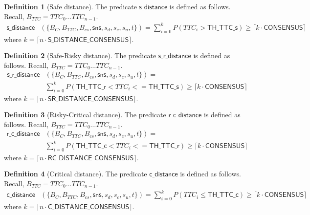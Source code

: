 \documentclass[12pt]{article}
\theoremstyle{definition}
\newtheorem{definition}{Definition}[section]
\begin{document}
\begin{definition}[Safe distance]
The predicate $\mathsf{s\_distance}$ is defined as follows. Recall, $B_{TTC} = TTC_0 \ldots TTC_{n-1}$.
\[
    \begin{aligned}
            \mathsf{s\_distance}&(\{B_C, B_{TTC}, B_{cs}, \mathsf{sns}, s_d, s_c, s_u, t\}) = \sum_{i=0}^{k} P(TTC_i > \mathsf{TH\_TTC\_s}) \geq \lceil k \cdot \mathsf{ CONSENSUS}\rceil
    \end{aligned}
\]
where $k = \lceil n \cdot \mathsf{S\_DISTANCE\_CONSENSUS} \rceil$.
    
\end{definition}

\begin{definition}[Safe-Risky distance]
The predicate $\mathsf{s\_r\_distance}$ is defined as follows. Recall, $B_{TTC} = TTC_0 \ldots TTC_{n-1}$.
\[
    \begin{aligned}
        \mathsf{s\_r\_distance}&(\{B_C, B_{TTC}, B_{cs}, \mathsf{sns}, s_d, s_c, s_u, t\}) = \\
        &\sum_{i=0}^{k} P(\mathsf{TH\_TTC\_r} < TTC_i <= \mathsf{TH\_TTC\_s}) \geq \lceil k \cdot \mathsf{CONSENSUS}\rceil
    \end{aligned}
\]
where $k = \lceil n \cdot \mathsf{SR\_DISTANCE\_CONSENSUS} \rceil$.
    
\end{definition}

\begin{definition}[Risky-Critical distance]
The predicate $\mathsf{r\_c\_distance}$ is defined as follows. Recall, $B_{TTC} = TTC_0 \ldots TTC_{n-1}$.
\[
    \begin{aligned}
        \mathsf{r\_c\_distance}&(\{B_C, B_{TTC}, B_{cs}, \mathsf{sns}, s_d, s_c, s_u, t\}) = \\ 
        &\sum_{i=0}^{k} P(\mathsf{TH\_TTC\_c} < TTC_i <= \mathsf{TH\_TTC\_r}) \geq \lceil k \cdot \mathsf{CONSENSUS}\rceil
    \end{aligned}
\]
where $k = \lceil n \cdot \mathsf{RC\_DISTANCE\_CONSENSUS} \rceil$.    
\end{definition}

\begin{definition}[Critical distance]
The predicate $\mathsf{c\_distance}$ is defined as follows. Recall, $B_{TTC} = TTC_0 \ldots TTC_{n-1}$.
\[
    \begin{aligned}
        \mathsf{c\_distance}&(\{B_C, B_{TTC}, B_{cs}, \mathsf{sns}, s_d, s_c, s_u, t\}) = \sum_{i=0}^{k} P(TTC_i \leq \mathsf{TH\_TTC\_c}) \geq \lceil k \cdot \mathsf{CONSENSUS}\rceil
    \end{aligned}
\]
where $k = \lceil n \cdot \mathsf{C\_DISTANCE\_CONSENSUS} \rceil$.    
\end{definition}
\end{document}
